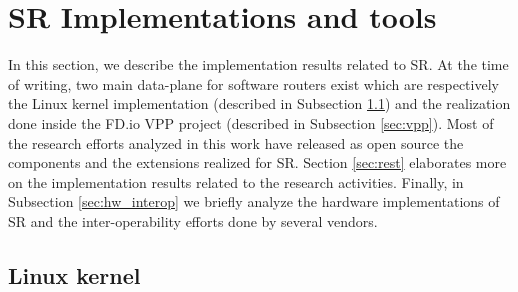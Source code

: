 \section{SR Implementations and tools}
\label{sec:tools}

\begin{comment}

\begin{itemize}
    \item VPP implementation of SR
    \item Other open source implementations from the works listed in Research Directions (if the tools are open source and are valuable)
    \item Other implementations from vendors
\end{itemize}

\end{comment}

In this section, we describe the implementation results related to SR. At the time of writing, two main data-plane for software routers exist which are respectively the Linux kernel implementation (described in Subsection \ref{sec:linux}) and the realization done inside the FD.io VPP project (described in Subsection \ref{sec:vpp}). Most of the research efforts analyzed in this work have released as open source the components and the extensions realized for SR. Section \ref{sec:rest} elaborates more on the implementation results related to the research activities. Finally, in Subsection \ref{sec:hw_interop} we briefly analyze the hardware implementations of SR and the inter-operability efforts done by several vendors.

\subsection{Linux kernel}
\label{sec:linux}


